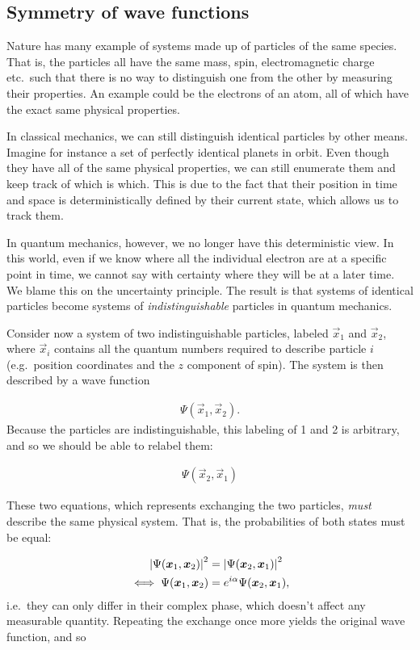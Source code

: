 \documentclass[Thesis.tex]{subfiles}
\begin{document}
\subsection{Symmetry of wave functions}

Nature has many example of systems made up of particles of the same
species. That is, the particles all have the same mass, spin, electromagnetic
charge etc.\ such that there is no way to  distinguish one from the other by
measuring their properties. An example could be the electrons of an atom, all of
which have the exact same physical properties.

In classical mechanics, we can still distinguish identical particles by other
means. Imagine for instance a set of perfectly identical planets in orbit. Even
though they have all of the same physical properties, we can still enumerate
them and keep track of which is which. This is due to the fact that their
position in time and space is deterministically defined by their current state,
which allows us to track them.

In quantum mechanics, however, we no longer have this deterministic view. In
this world, even if we know where all the individual electron are at a specific
point in time, we cannot say with certainty where they will be at a later
time. We blame this on the uncertainty principle. The result is that systems of
identical particles become systems of \emph{indistinguishable} particles in
quantum mechanics.

Consider now a system of two indistinguishable particles, labeled $\vec x_1$ and
$\vec x_2$, where $\vec x_i$ contains all the quantum numbers required to describe
particle $i$ (e.g.\ position coordinates and the $z$ component of spin). The
system is then described by a wave function

\begin{align}
    \Psi(\vec x_1, \vec x_2).
\end{align}
Because the particles are indistinguishable, this labeling of 1 and 2 is
arbitrary, and so we should be able to relabel them:

\begin{align}
    \Psi(\vec x_2, \vec x_1)
\end{align}

These two equations, which represents exchanging the two particles, \emph{must}
describe the same physical system. That is, the probabilities of both states
must be equal:

\begin{align}
    \abs{\Psi(\bm{x}_1, \bm{x}_2)}^2 &= \abs{\Psi(\bm{x}_2, \bm{x}_1)}^2\\
    \iff \Psi(\bm{x}_1,\bm{x}_2) &= e^{i\alpha}\Psi(\bm{x}_2, \bm{x}_1),
\end{align}
i.e.\ they can only differ in their complex phase, which doesn't affect any measurable
quantity. Repeating the exchange once more yields the original wave function, and so
\end{document}
